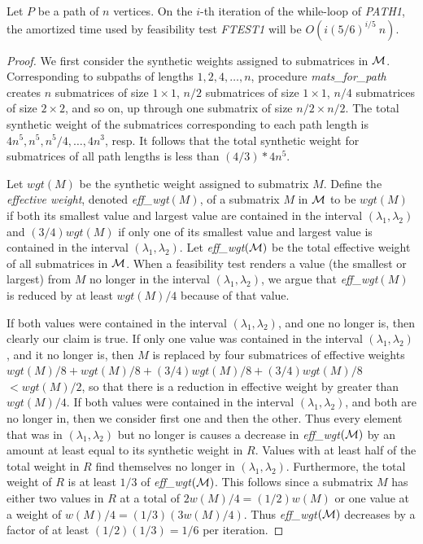 {{{\begin{lemma}
\label{lem:3:2}
Let $P$ be a path of $n$ vertices.
On the $i$-th iteration of the while-loop of {\it PATH1},
the amortized time used by feasibility test {\it FTEST1}
will be $O(i(5/6)^{i/5}\:n)$.
\end{lemma}

\begin{proof}
We first consider the synthetic weights assigned to submatrices in $\cal M$.
Corresponding to subpaths of lengths $1, 2, 4, \ldots , n$,
procedure {\it mats\_for\_path} creates
$n$ submatrices of size $1 \times 1$,
$n/2$ submatrices of size $1 \times 1$,
$n/4$ submatrices of size $2 \times 2$, and so on,
up through one submatrix of size $n/2 \times n/2$.
The total synthetic weight of the submatrices corresponding to each path length is
$4n^5, n^5, n^5/4, \ldots , 4n^3$, resp.
It follows that the total synthetic weight for submatrices of all path lengths is
less than $(4/3)*4n^5$.

Let $wgt(M)$ be the synthetic weight assigned to submatrix $M$.
Define the {\it effective weight},
denoted {\it eff\_wgt}$(M)$, of a submatrix $M$ in $\cal M$
to be $wgt(M)$ if both its smallest value and largest value
are contained in the interval $(\lambda_1, \lambda_2)$
and $(3/4)wgt(M)$ if only one of its smallest value and largest value
is contained in the interval $(\lambda_1, \lambda_2)$.
Let {\it eff\_wgt}$(\cal M )$ be the total effective weight of all submatrices in $\cal M$.
When a feasibility test renders a value (the smallest or largest)
from $M$ no longer in the interval $(\lambda_1, \lambda_2)$,
we argue that {\it eff\_wgt}$(M)$ is reduced by at least $wgt(M)/4$
because of that value.

If both values were contained in the interval $(\lambda_1, \lambda_2)$,
and one no longer is, then clearly our claim is true.
If only one value was contained in the interval $(\lambda_1, \lambda_2)$,
and it no longer is,
then $M$ is replaced by four submatrices of effective weights
$wgt(M)/8 + wgt(M)/8 + (3/4)wgt(M)/8 + (3/4)wgt(M)/8$ $< wgt(M)/2$,
so that there is a reduction in effective weight by greater than $wgt(M)/4$.
If both values were contained in the interval $(\lambda_1, \lambda_2)$,
and both are no longer in,
then we consider first one and then the other.
Thus every element that was in $(\lambda_1, \lambda_2)$ but no longer is
causes a decrease in {\it eff\_wgt}$(\cal M )$ by an amount
at least equal to its synthetic weight in $R$.
Values with at least half of the total weight in $R$
find themselves no longer in $(\lambda_1, \lambda_2)$.
Furthermore, the total weight of $R$ is at least $1/3$ of
{\it eff\_wgt}$(\cal M )$.
This follows since a submatrix $M$ has either two values in $R$
at a total of $2w(M)/4 = (1/2)w(M)$
or one value at a weight of $w(M)/4 = (1/3)(3w(M)/4)$.
Thus {\it eff\_wgt}$(\cal M )$
decreases by a factor of at least $(1/2)(1/3) = 1/6$ per iteration.


\end{proof}}}}
